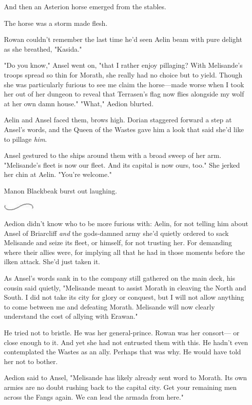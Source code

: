And then an Asterion horse emerged from the stables.

The horse was a storm made flesh.

Rowan couldn't remember the last time he'd seen Aelin beam with pure delight as she breathed, "Kasida."

"Do you know," Ansel went on, "that I rather enjoy pillaging? With Melisande's troops spread so thin for Morath, she really had no choice but to yield. Though she was particularly furious to see me claim the horse---made worse when I took her out of her dungeon to reveal that Terrasen's flag now flies alongside my wolf at her own damn house." "What," Aedion blurted.

Aelin and Ansel faced them, brows high. Dorian staggered forward a step at Ansel's words, and the Queen of the Wastes gave him a look that said she'd like to pillage \emph{him}.

Ansel gestured to the ships around them with a broad sweep of her arm. "Melisande's fleet is now our fleet. And its capital is now ours, too." She jerked her chin at Aelin. "You're welcome."

Manon Blackbeak burst out laughing.

\includegraphics[width=0.65in,height=0.13in]{images/seperator}

Aedion didn't know who to be more furious with: Aelin, for not telling him about Ansel of Briarcliff \emph{and} the gods-damned army she'd quietly ordered to sack Melisande and seize its fleet, or himself, for not trusting her. For demanding where their allies were, for implying all that he had in those moments before the ilken attack. She'd just taken it.

As Ansel's words sank in to the company still gathered on the main deck, his cousin said quietly, "Melisande meant to assist Morath in cleaving the North and South. I did not take its city for glory or conquest, but I will not allow anything to come between me and defeating Morath. Melisande will now clearly understand the cost of allying with Erawan."

He tried not to bristle. He was her general-prince. Rowan was her consort--- or close enough to it. And yet she had not entrusted them with this. He hadn't even contemplated the Wastes as an ally. Perhaps that was why. He would have told her not to bother.

Aedion said to Ansel, "Melisande has likely already sent word to Morath. Its own armies are no doubt rushing back to the capital city. Get your remaining men across the Fangs again. We can lead the armada from here."

